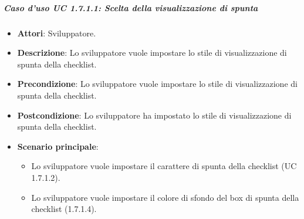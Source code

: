 \subparagraph{Caso d'uso UC 1.7.1.1: Scelta della visualizzazione di spunta}

\FloatBarrier
\begin{itemize}
\item\textbf{Attori}: Sviluppatore.
\item\textbf{Descrizione}: Lo sviluppatore vuole impostare lo stile di visualizzazione di spunta della checklist.
\item\textbf{Precondizione}: Lo sviluppatore vuole impostare lo stile di visualizzazione di spunta della checklist.
\item\textbf{Postcondizione}: Lo sviluppatore ha impostato lo stile di visualizzazione di spunta della checklist.
\item\textbf{Scenario principale}: 
\begin{itemize}
	\item Lo sviluppatore vuole impostare il carattere di spunta della checklist (UC 1.7.1.2).
	\item Lo sviluppatore vuole impostare il colore di sfondo del box di spunta della checklist (1.7.1.4).
\end{itemize}
\end{itemize}